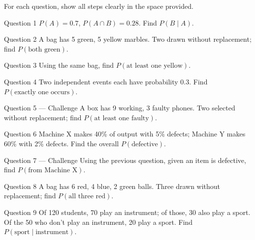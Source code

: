 \documentclass[11pt]{article}
\begin{document}
\clearpage
{}
For each question, show all steps clearly in the space provided.

\begin{qbox}{Question 1}
$P(A)=0.7$, $P(A\cap B)=0.28$. Find $P(B\mid A)$.\workspace{2.4cm}
\end{qbox}

\begin{qbox}{Question 2}
A bag has 5 green, 5 yellow marbles. Two drawn without replacement; find $P(\text{both green})$.\workspace{2.4cm}
\end{qbox}

\begin{qbox}{Question 3}
Using the same bag, find $P(\text{at least one yellow})$.\workspace{2.4cm}
\end{qbox}

\begin{qbox}{Question 4}
Two independent events each have probability 0.3. Find $P(\text{exactly one occurs})$.\workspace{2.4cm}
\end{qbox}

\begin{qbox}{Question 5 --- Challenge}
A box has 9 working, 3 faulty phones. Two selected without replacement; find $P(\text{at least one faulty})$.\workspace{3.2cm}
\end{qbox}

\begin{qbox}{Question 6}
Machine X makes 40\% of output with 5\% defects; Machine Y makes 60\% with 2\% defects. Find the overall $P(\text{defective})$.\workspace{2.4cm}
\end{qbox}

\begin{qbox}{Question 7 --- Challenge}
Using the previous question, given an item is defective, find $P(\text{from Machine X})$.\workspace{3.2cm}
\end{qbox}

\begin{qbox}{Question 8}
A bag has 6 red, 4 blue, 2 green balls. Three drawn without replacement; find $P(\text{all three red})$.\workspace{2.4cm}
\end{qbox}

\begin{qbox}{Question 9}
Of 120 students, 70 play an instrument; of those, 30 also play a sport. Of the 50 who don't play an instrument, 20 play a sport. Find $P(\text{sport}\mid\text{instrument})$.\workspace{2.4cm}
\end{qbox}
\end{document}
